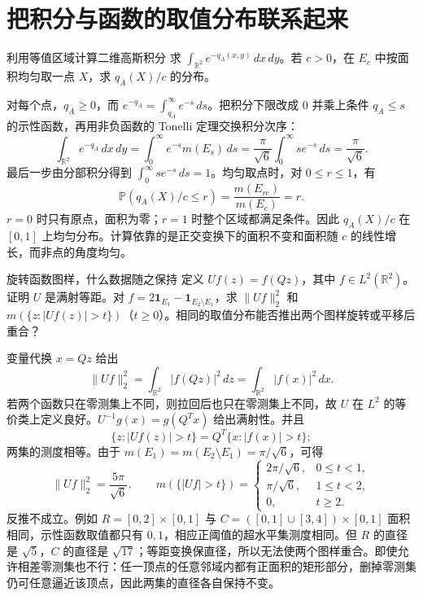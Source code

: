 \section{把积分与函数的取值分布联系起来}

\begin{example}{利用等值区域计算二维高斯积分}
求 \(\int_{\mathbb R^2}e^{-q_A(x,y)}\,dx\,dy\)。若 \(c>0\)，在 \(E_c\) 中按面积均匀取一点 \(X\)，求 \(q_A(X)/c\) 的分布。
\end{example}
\begin{solution}
对每个点，\(q_A\geq0\)，而 \(e^{-q_A}=\int_{q_A}^\infty e^{-s}\,ds\)。把积分下限改成 \(0\) 并乘上条件 \(q_A\leq s\) 的示性函数，再用非负函数的 Tonelli 定理交换积分次序：
\[
 \int_{\mathbb R^2}e^{-q_A}\,dx\,dy
 =\int_0^\infty e^{-s}m(E_s)\,ds
 =\frac{\pi}{\sqrt6}\int_0^\infty se^{-s}\,ds
 =\frac{\pi}{\sqrt6}.
\]
最后一步由分部积分得到 \(\int_0^\infty se^{-s}\,ds=1\)。均匀取点时，对 \(0\leq r\leq1\)，有
\[
 \mathbb P(q_A(X)/c\leq r)=\frac{m(E_{rc})}{m(E_c)}=r.
\]
\(r=0\) 时只有原点，面积为零；\(r=1\) 时整个区域都满足条件。因此 \(q_A(X)/c\) 在 \([0,1]\) 上均匀分布。计算依靠的是正交变换下的面积不变和面积随 \(c\) 的线性增长，而非点的角度均匀。
\end{solution}

\begin{example}{旋转函数图样，什么数据随之保持}
定义 \(Uf(z)=f(Qz)\)，其中 \(f\in L^2(\mathbb R^2)\)。证明 \(U\) 是满射等距。对 \(f=2\mathbf 1_{E_1}-\mathbf 1_{E_2\setminus E_1}\)，求 \(\|Uf\|_2^2\) 和 \(m(\{z:|Uf(z)|>t\})\)（\(t\geq0\)）。相同的取值分布能否推出两个图样旋转或平移后重合？
\end{example}
\begin{solution}
变量代换 \(x=Qz\) 给出
\[
 \|Uf\|_2^2=\int_{\mathbb R^2}|f(Qz)|^2\,dz
 =\int_{\mathbb R^2}|f(x)|^2\,dx.
\]
若两个函数只在零测集上不同，则拉回后也只在零测集上不同，故 \(U\) 在 \(L^2\) 的等价类上定义良好。\(U^{-1}g(x)=g(Q^Tx)\) 给出满射性。并且
\[
 \{z:|Uf(z)|>t\}=Q^T\{x:|f(x)|>t\};
\]
两集的测度相等。由于 \(m(E_1)=m(E_2\setminus E_1)=\pi/\sqrt6\)，可得
\[
 \|Uf\|_2^2=\frac{5\pi}{\sqrt6},\qquad
 m(\{|Uf|>t\})=
 \begin{cases}
 2\pi/\sqrt6,&0\leq t<1,\\
 \pi/\sqrt6,&1\leq t<2,\\
 0,&t\geq2.
 \end{cases}
\]
反推不成立。例如 \(R=[0,2]\times[0,1]\) 与
\(C=([0,1]\cup[3,4])\times[0,1]\) 面积相同，示性函数取值都只有 \(0,1\)，相应正阈值的超水平集测度相同。但 \(R\) 的直径是 \(\sqrt5\)，\(C\) 的直径是 \(\sqrt{17}\)；等距变换保直径，所以无法使两个图样重合。即使允许相差零测集也不行：任一顶点的任意邻域内都有正面积的矩形部分，删掉零测集仍可任意逼近该顶点，因此两集的直径各自保持不变。
\end{solution}

